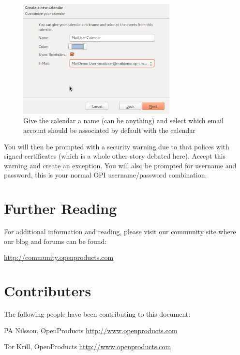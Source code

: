 \documentclass[12pt,a4paper,titlepage]{article}
\begin{document}
\begin{figure}[h!]
\centering
\includegraphics[width=8cm]{./img/External-clients-lightning3.png}
\caption{Give the calendar a name (can be anything) and select which email account should be associated by default with the calendar}
\end{figure}
\FloatBarrier
You will then be prompted with a security warning due to that polices with signed certificates (which is a whole other story debated here). Accept this warning and create an exception. You will also be prompted for username and password, this is your normal OPI username/password combination.

\newpage
\section{Further Reading}
For additional information and reading, please visit our community site where our blog and forums can be found:

\href{http://community.openproducts.com}{http://community.openproducts.com}
\newpage
\section{Contributers}
The following people have been contributing to this document:
\begin{description}
\item PA Nilsson, OpenProducts \href{http://www.openproducts.com}{http://www.openproducts.com}
\item Tor Krill, OpenProducts \href{http://www.openproducts.com}{http://www.openproducts.com}
\end{description}
\end{document}
